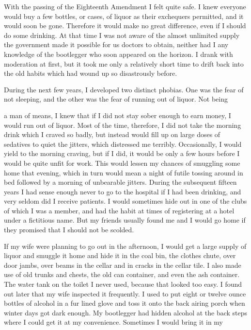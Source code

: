 \begin{biblechapter}
With the passing of the Eighteenth Amendment I felt quite safe. I knew everyone would buy a few bottles, or cases, of liquor as their exchequers permitted, and it would soon be gone. Therefore it would make no great difference, even if I should do some drinking. At that time I was not aware of the almost unlimited supply the government made it possible for us doctors to obtain, neither had I any knowledge of the bootlegger who soon appeared on the horizon. I drank with moderation at first, but it took me only a relatively short time to drift back into the old habits which had wound up so disastrously before.

During the next few years, I developed two distinct phobias. One was the fear of not sleeping, and the other was the fear of running out of liquor. Not being

a man of means, I knew that if I did not stay sober enough to earn money, I would run out of liquor. Most of the time, therefore, I did not take the morning drink which I craved so badly, but instead would fill up on large doses of sedatives to quiet the jitters, which distressed me terribly. Occasionally, I would yield to the morning craving, but if I did, it would be only a few hours before I would be quite unfit for work. This would lessen my chances of smuggling some home that evening, which in turn would mean a night of futile tossing around in bed followed by a morning of unbearable jitters. During the subsequent fifteen years I had sense enough never to go to the hospital if I had been drinking, and very seldom did I receive patients. I would sometimes hide out in one of the clubs of which I was a member, and had the habit at times of registering at a hotel under a fictitious name. But my friends usually found me and I would go home if they promised that I should not be scolded.

If my wife were planning to go out in the afternoon, I would get a large supply of liquor and smuggle it home and hide it in the coal bin, the clothes chute, over door jambs, over beams in the cellar and in cracks in the cellar tile. I also made use of old trunks and chests, the old can container, and even the ash container. The water tank on the toilet I never used, because that looked too easy. I found out later that my wife inspected it frequently. I used to put eight or twelve ounce bottles of alcohol in a fur lined glove and toss it onto the back airing porch when winter days got dark enough. My bootlegger had hidden alcohol at the back steps where I could get it at my convenience. Sometimes I would bring it in my


\end{biblechapter}

